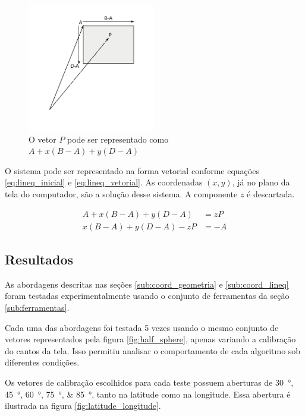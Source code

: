 \documentclass[brazil,pagestart=firstchapter]{abnt}
\begin{document}
\begin{figure}[h]
\centering
\includegraphics[width=0.5\textwidth]{img/lineq.pdf}
\caption{O vetor $P$ pode ser representado como $A + x(B-A) + y(D-A)$}
\label{fig:lineq}
\end{figure}

O sistema pode ser representado na forma vetorial conforme equações
\eqref{eq:lineq_inicial} e \eqref{eq:lineq_vetorial}. As coordenadas $(x,
y)$, já no plano da tela do computador, são a solução desse sistema. A
componente $z$ é descartada.

\begin{align}
\label{eq:lineq_inicial}
A + x (B-A) + y (D-A) & = z P  \\
\label{eq:lineq_vetorial}
x (B-A) + y (D-A) - z P & = -A
\end{align}



\subsection{Resultados}
\label{sub:coord_resultados}

As abordagens descritas nas seções \ref{sub:coord_geometria} e
\ref{sub:coord_lineq} foram testadas experimentalmente usando o conjunto de
ferramentas da seção \ref{sub:ferramentas}.

Cada uma das abordagens foi testada 5 vezes usando o mesmo conjunto de
vetores representados pela figura \ref{fig:half_sphere}, apenas variando a
calibração do cantos da tela. Isso permitiu analisar o comportamento de cada
algoritmo sob diferentes condições.

Os vetores de calibração escolhidos para cada teste possuem aberturas de
\SIlist{30;45;60;75;85}{\degree}, tanto na latitude como na longitude. Essa
abertura é ilustrada na figura \ref{fig:latitude_longitude}.
\end{document}
